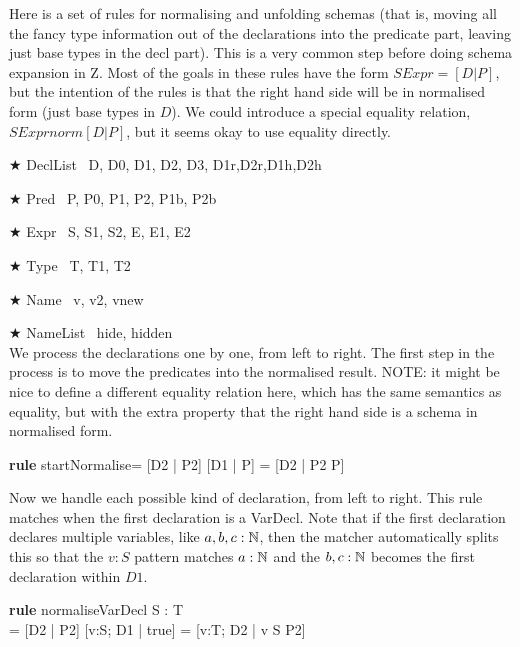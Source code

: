 \documentclass{article}
\newenvironment{zedrule}[1]{\par\textbf{rule }#1\vspace{-2ex}\infrule}{\endinfrule}
\newcommand{\derives}{\derive{}}
\newenvironment{zedjoker}[1]{\par$\bigstar$ #1\ }{}
\newcommand{\proviso}{\raisebox{0.5ex}{${}_{\blacktriangleright}\ $}}%
\begin{document}
Here is a set of rules for normalising and unfolding schemas
(that is, moving all the fancy type information out of the
declarations into the predicate part, leaving just base types
in the decl part).   This is a very common step before doing
schema expansion in Z.  Most of the goals in these rules
have the form $SExpr = [D|P]$, but the intention of the rules
is that the right hand side will be in normalised form
(just base types in $D$).  We could introduce a special
equality relation, $SExpr \mathrel{norm} [D|P]$, but it seems
okay to use equality directly.

\begin{zedjoker}{DeclList} D, D0, D1, D2, D3, D1r,D2r,D1h,D2h\end{zedjoker} \\
\begin{zedjoker}{Pred} P, P0, P1, P2, P1b, P2b \end{zedjoker} \\
\begin{zedjoker}{Expr} S, S1, S2, E, E1, E2 \end{zedjoker} \\
\begin{zedjoker}{Type} T, T1, T2 \end{zedjoker} \\
\begin{zedjoker}{Name} v, v2, vnew \end{zedjoker} \\
\begin{zedjoker}{NameList} hide, hidden \end{zedjoker} \\

We process the declarations one by one, from left to right.
The first step in the process is to move the predicates into
the normalised result.    NOTE: it might be nice to define
a different equality relation here, which has the same semantics
as equality, but with the extra property that the right hand side
is a schema in normalised form.
\begin{zedrule}{startNormalise}
   [D1 | true] = [D2 | P2]
\derives
   [D1 | P] = [D2 | P2 \land P]
\end{zedrule}

Now we handle each possible kind of declaration, from left to right.
This rule matches when the first declaration is a VarDecl.
Note that if the first declaration declares multiple variables,
like $a,b,c:{\mathbb N}$, then the matcher automatically splits this
so that the $v:S$ pattern matches $a:{\mathbb N}$ and the $b,c:{\mathbb N}$
becomes the first declaration within $D1$.
\begin{zedrule}{normaliseVarDecl}
   \proviso S : \power T \\
   [D1 | true] = [D2 | P2]
\derives
   [v:S; D1 | true] = [v:T; D2 | v \in S \land P2]
\end{zedrule}
\end{document}
